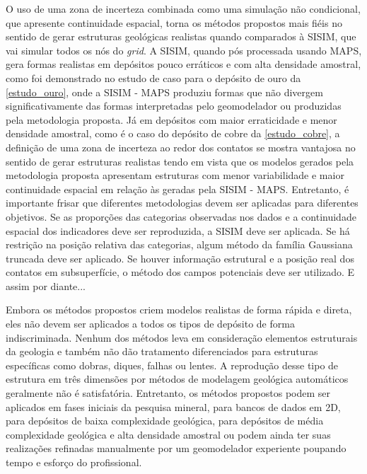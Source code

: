 O uso de uma zona de incerteza combinada como uma simulação não condicional, que apresente continuidade espacial, torna os métodos propostos mais fiéis no sentido de gerar estruturas geológicas realistas quando comparados à SISIM, que vai simular todos os nós do \textit{grid}. A SISIM, quando pós processada usando MAPS, gera formas realistas em depósitos pouco erráticos e com alta densidade amostral, como foi demonstrado no estudo de caso para o depósito de ouro da \autoref{estudo_ouro}, onde a SISIM - MAPS produziu formas que não divergem significativamente das formas interpretadas pelo geomodelador ou produzidas pela metodologia proposta. Já em depósitos com maior erraticidade e menor densidade amostral, como é o caso do depósito de cobre da \autoref{estudo_cobre}, a definição de uma zona de incerteza ao redor dos contatos se mostra vantajosa no sentido de gerar estruturas realistas tendo em vista que os modelos gerados pela metodologia proposta apresentam estruturas com menor variabilidade e maior continuidade espacial em relação às geradas pela SISIM - MAPS. Entretanto, é importante frisar que diferentes metodologias devem ser aplicadas para diferentes objetivos. Se as proporções das categorias observadas nos dados e a continuidade espacial dos indicadores deve ser reproduzida, a SISIM deve ser aplicada. Se há restrição na posição relativa das categorias, algum método da família Gaussiana truncada deve ser aplicado. Se houver informação estrutural e a posição real dos contatos em subsuperfície, o método dos campos potenciais deve ser utilizado. E assim por diante...

Embora os métodos propostos criem modelos realistas de forma rápida e direta, eles não devem ser aplicados a todos os tipos de depósito de forma indiscriminada. Nenhum dos métodos leva em consideração elementos estruturais da geologia e também não dão tratamento diferenciados para estruturas específicas como dobras, diques, falhas ou lentes. A reprodução desse tipo de estrutura em três dimensões por métodos de modelagem geológica automáticos geralmente não é satisfatória. Entretanto, os métodos propostos podem ser aplicados em fases iniciais da pesquisa mineral, para bancos de dados em 2D, para depósitos de baixa complexidade geológica, para depósitos de média complexidade geológica e alta densidade amostral ou podem ainda ter suas realizações refinadas manualmente por um geomodelador experiente poupando tempo e esforço do profissional.

